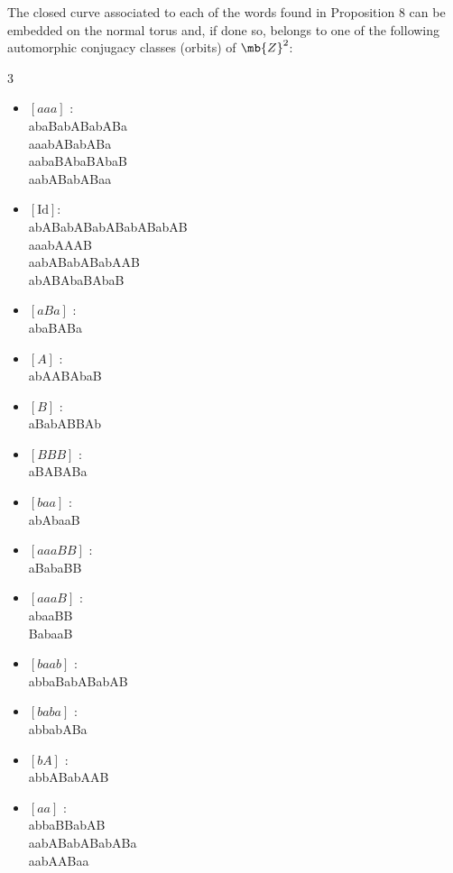 \documentclass[11pt]{article}
\begin{document}
\begin{prop}
The closed curve associated to each of the words found in Proposition 8 can be embedded on the normal torus and, if done so, belongs to one of the following automorphic conjugacy classes (orbits) of $\mb{Z}^2$:
\begin{multicols}{3}
\begin{itemize}
\item $[aaa]$ : \\
abaBabABabABa\\
aaabABabABa\\
aabaBAbaBAbaB\\
aabABabABaa

\item $[\text{Id}]$: \\
abABabABabABabABabAB\\
aaabAAAB\\
aabABabABabAAB\\
abABAbaBAbaB

\item $[aBa]$ : \\
abaBABa

\item $[A]$ : \\
abAABAbaB

\item $[B]$ : \\
aBabABBAb

\item $[BBB]$ : \\
aBABABa

\item $[baa]$ : \\
abAbaaB

\item $[aaaBB]$ : \\
aBabaBB

\item $[aaaB]$ : \\
abaaBB\\
BabaaB

\item $[baab]$ : \\
abbaBabABabAB

\item $[baba]$ : \\
abbabABa

\item $[bA]$ : \\
abbABabAAB

\item $[aa]$ : \\
abbaBBabAB\\
aabABabABabABa\\
aabAABaa


\end{itemize}
\end{multicols}
\end{prop}
\end{document}
